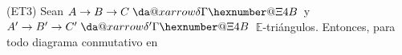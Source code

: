 \documentclass[preview]{standalone}
\makeatletter
\newcommand*{\da@xarrow}[7]{%
                                   \sbox0{$\ifx#7\scriptstyle\scriptscriptstyle\else\scriptstyle\fi#5#1#6\m@th$}%
                                   \sbox2{$\ifx#7\scriptstyle\scriptscriptstyle\else\scriptstyle\fi#5#2#6\m@th$}%
                                   \sbox4{$#7\dabar@\m@th$}%
                                   \dimen@=\wd0 %
                                   \ifdim\wd2 >\dimen@
                                     \dimen@=\wd2 %
                                   \fi
                                   \count@=2 %
                                   \def\da@bars{\dabar@\dabar@}%
                                   \@whiledim\count@\wd4<\dimen@\do{%
                                     \advance\count@\@ne
                                     \expandafter\def\expandafter\da@bars\expandafter{%
                                       \da@bars
                                       \dabar@ 
                                     }%
                                   }%
                                   \mathrel{#3}%
                                   \mathrel{%
                                     \mathop{\da@bars}\limits
                                     \ifx\\#1\\%
                                     \else
                                       _{\copy0}%
                                     \fi
                                     \ifx\\#2\\%
                                     \else
                                       ^{\copy2}%
                                     \fi
                                   }%
                                   \mathrel{#4}%
                                 }
\newcommand*{\da@rightarrow}{\mathchar"0\hexnumber@\symAMSa 4B }
\newcommand*{\xdashrightarrow}[2][]{%
                                   \mathrel{%
                                     \mathpalette{\da@xarrow{#1}{#2}{}\da@rightarrow{\,}{}}{}%
                                   }%
                                 }
\makeatother
\begin{document}
\begin{center}
(ET3) Sean $A\to B\to C\xdashrightarrow{\delta}$ y $A'\to B'\to C'\xdashrightarrow{\delta'}$ $\mathbb{E}$-triángulos. Entonces, para todo diagrama conmutativo en
\end{center}
\end{document}
